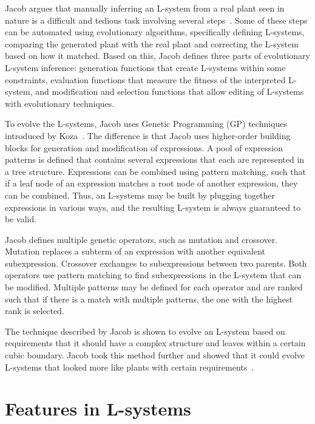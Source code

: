 Jacob argues that manually inferring an L-system from a real plant seen in nature is a difficult and tedious task involving several steps~\cite{Jacob1998}.
Some of these steps can be automated using evolutionary algorithms, specifically defining L-systems, comparing the generated plant with the real plant and correcting the L-system based on how it matched.
Based on this, Jacob defines three parts of evolutionary L-system inference: generation functions that create L-systems within some constraints, evaluation functions that measure the fitness of the interpreted L-system, and modification and selection functions that allow editing of L-systems with evolutionary techniques.

To evolve the L-systems, Jacob uses Genetic Programming (GP) techniques introduced by Koza~\cite{Koza1993}.
The difference is that Jacob uses higher-order building blocks for generation and modification of expressions.
A pool of expression patterns is defined that contains several expressions that each are represented in a tree structure.
Expressions can be combined using pattern matching, such that if a leaf node of an expression matches a root node of another expression, they can be combined.
Thus, an L-systems may be built by plugging together expressions in various ways, and the resulting L-system is always guaranteed to be valid.

Jacob defines multiple genetic operators, such as mutation and crossover.
Mutation replaces a subterm of an expression with another equivalent subexpression.
Crossover exchanges to subexpressions between two parents.
Both operators use pattern matching to find subexpressions in the L-system that can be modified.
Multiple patterns may be defined for each operator and are ranked such that if there is a match with multiple patterns, the one with the highest rank is selected.

The technique described by Jacob is shown to evolve an L-system based on requirements that it should have a complex structure and leaves within a certain cubic boundary.
Jacob took this method further and showed that it could evolve L-systems that looked more like plants with certain requirements~\cite{Jacob1995,Jacob1996,Jacob1996-2}.

\section{Features in L-systems}
